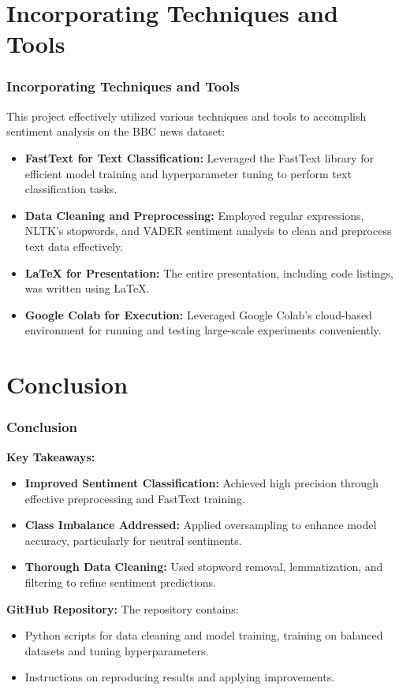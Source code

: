 \documentclass{beamer}
\begin{document}
\section{Incorporating Techniques and Tools}
\begin{frame}
    \frametitle{Incorporating Techniques and Tools}
    This project effectively utilized various techniques and tools to accomplish sentiment analysis on the BBC news dataset:

    \begin{itemize}
        \item \textbf{FastText for Text Classification:} Leveraged the FastText library for efficient model training and hyperparameter tuning to perform text classification tasks.
        \item \textbf{Data Cleaning and Preprocessing:} Employed regular expressions, NLTK’s stopwords, and VADER sentiment analysis to clean and preprocess text data effectively.
        \item \textbf{LaTeX for Presentation:} The entire presentation, including code listings, was written using LaTeX.
        \item \textbf{Google Colab for Execution:} Leveraged Google Colab’s cloud-based environment for running and testing large-scale experiments conveniently.
    \end{itemize}
\end{frame}
\section{Conclusion}
\begin{frame}
    \frametitle{Conclusion}
    \textbf{Key Takeaways:}
    \begin{itemize}
\begin{itemize}
    \item \textbf{Improved Sentiment Classification:} Achieved high precision through effective preprocessing and FastText training.
    \item \textbf{Class Imbalance Addressed:} Applied oversampling to enhance model accuracy, particularly for neutral sentiments.
    \item \textbf{Thorough Data Cleaning:} Used stopword removal, lemmatization, and filtering to refine sentiment predictions.
\end{itemize}
    \end{itemize}

    \vspace{0.4cm}
    \textbf{GitHub Repository:}
    The repository contains:
    \begin{itemize}
        \item Python scripts for data cleaning and model training, training on balanced datasets and tuning hyperparameters.
        \item Instructions on reproducing results and applying improvements.
    \end{itemize}
\end{frame}
\end{document}
